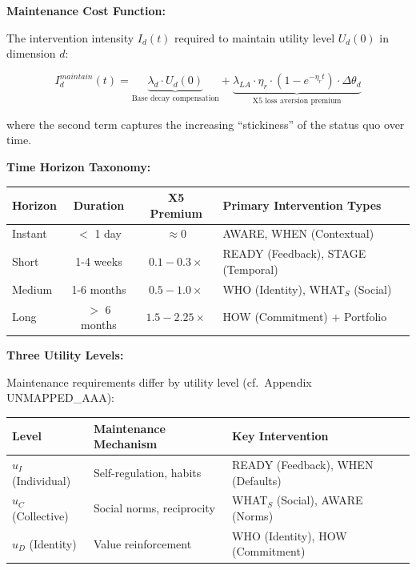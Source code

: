 \begin{tcolorbox}[colback=orange!5!white, colframe=orange!75!black,
    title=\textbf{Method UNTCM-M5: Maintenance Cost Analysis}]
\textbf{Maintenance Cost Function:}

The intervention intensity $I_d(t)$ required to maintain utility level $U_d(0)$ in dimension $d$:

\begin{equation}
I_d^{maintain}(t) = \underbrace{\lambda_d \cdot U_d(0)}_{\text{Base decay compensation}} + \underbrace{\lambda_{LA} \cdot \eta_r \cdot (1 - e^{-\eta_r t}) \cdot \Delta\theta_d}_{\text{X5 loss aversion premium}}
\label{eq:maintenance-cost}
\end{equation}

where the second term captures the increasing ``stickiness'' of the status quo over time.

\textbf{Time Horizon Taxonomy:}

\begin{center}
\renewcommand{\arraystretch}{1.3}
\begin{tabular}{@{}lccl@{}}
\toprule
\textbf{Horizon} & \textbf{Duration} & \textbf{X5 Premium} & \textbf{Primary Intervention Types} \\
\midrule
Instant & $<$ 1 day & $\approx 0$ & AWARE, WHEN (Contextual) \\
Short & 1-4 weeks & $0.1-0.3\times$ & READY (Feedback), STAGE (Temporal) \\
Medium & 1-6 months & $0.5-1.0\times$ & WHO (Identity), WHAT$_S$ (Social) \\
Long & $>$ 6 months & $1.5-2.25\times$ & HOW (Commitment) + Portfolio \\
\bottomrule
\end{tabular}
\end{center}

\textbf{Three Utility Levels:}

Maintenance requirements differ by utility level (cf.\ Appendix UNMAPPED_AAA):

\begin{center}
\renewcommand{\arraystretch}{1.3}
\begin{tabular}{@{}lll@{}}
\toprule
\textbf{Level} & \textbf{Maintenance Mechanism} & \textbf{Key Intervention} \\
\midrule
$u_I$ (Individual) & Self-regulation, habits & READY (Feedback), WHEN (Defaults) \\
$u_C$ (Collective) & Social norms, reciprocity & WHAT$_S$ (Social), AWARE (Norms) \\
$u_D$ (Identity) & Value reinforcement & WHO (Identity), HOW (Commitment) \\
\bottomrule
\end{tabular}
\end{center}


\end{tcolorbox}
